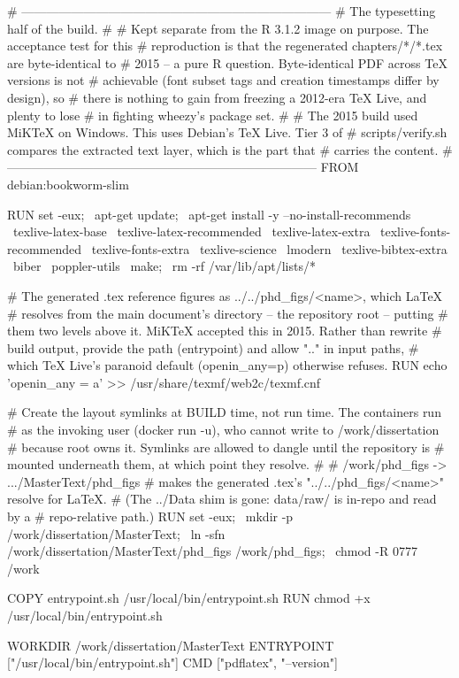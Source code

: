 # ---------------------------------------------------------------------------
# The typesetting half of the build.
#
# Kept separate from the R 3.1.2 image on purpose. The acceptance test for this
# reproduction is that the regenerated chapters/*/*.tex are byte-identical to
# 2015 -- a pure R question. Byte-identical PDF across TeX versions is not
# achievable (font subset tags and creation timestamps differ by design), so
# there is nothing to gain from freezing a 2012-era TeX Live, and plenty to lose
# in fighting wheezy's package set.
#
# The 2015 build used MiKTeX on Windows. This uses Debian's TeX Live. Tier 3 of
# scripts/verify.sh compares the extracted text layer, which is the part that
# carries the content.
# ---------------------------------------------------------------------------
FROM debian:bookworm-slim

RUN set -eux; \
    apt-get update; \
    apt-get install -y --no-install-recommends \
        texlive-latex-base \
        texlive-latex-recommended \
        texlive-latex-extra \
        texlive-fonts-recommended \
        texlive-fonts-extra \
        texlive-science \
        lmodern \
        texlive-bibtex-extra \
        biber \
        poppler-utils \
        make; \
    rm -rf /var/lib/apt/lists/*

# The generated .tex reference figures as ../../phd_figs/<name>, which LaTeX
# resolves from the main document's directory -- the repository root -- putting
# them two levels above it. MiKTeX accepted this in 2015. Rather than rewrite
# build output, provide the path (entrypoint) and allow ".." in input paths,
# which TeX Live's paranoid default (openin_any=p) otherwise refuses.
RUN echo 'openin_any = a' >> /usr/share/texmf/web2c/texmf.cnf

# Create the layout symlinks at BUILD time, not run time. The containers run
# as the invoking user (docker run -u), who cannot write to /work/dissertation
# because root owns it. Symlinks are allowed to dangle until the repository is
# mounted underneath them, at which point they resolve.
#
#   /work/phd_figs -> .../MasterText/phd_figs
#       makes the generated .tex's "../../phd_figs/<name>" resolve for LaTeX.
#       (The ../Data shim is gone: data/raw/ is in-repo and read by a
#       repo-relative path.)
RUN set -eux; \
    mkdir -p /work/dissertation/MasterText; \
    ln -sfn /work/dissertation/MasterText/phd_figs /work/phd_figs; \
    chmod -R 0777 /work

COPY entrypoint.sh /usr/local/bin/entrypoint.sh
RUN chmod +x /usr/local/bin/entrypoint.sh

WORKDIR /work/dissertation/MasterText
ENTRYPOINT ["/usr/local/bin/entrypoint.sh"]
CMD ["pdflatex", "--version"]
